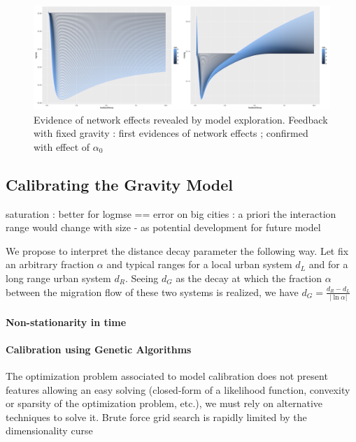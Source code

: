 \documentclass[Royal,sageh,times]{sagej}
\begin{document}
\begin{figure}
\centering
\includegraphics[width=\textwidth]{figures/Fig3}
\caption{Evidence of network effects revealed by model exploration. Feedback with fixed gravity : first evidences of network effects ; confirmed with effect of $\alpha_0$}
\end{figure}







\subsection*{Calibrating the Gravity Model}


\cite{batty1972calibration}

saturation : better for logmse == error on big cities : a priori the interaction range would change with size - as potential development for future model

We propose to interpret the distance decay parameter the following way. Let fix an arbitrary fraction $\alpha$ and typical ranges for a local urban system $d_L$ and for a long range urban system $d_R$. Seeing $d_G$ as the decay at which the fraction $\alpha$ between the migration flow of these two systems is realized, we have $d_G = \frac{d_R - d_L}{\left| \ln{\alpha} \right|}$


\paragraph{Non-stationarity in time}




\paragraph{Calibration using Genetic Algorithms}


The optimization problem associated to model calibration does not present features allowing an easy solving (closed-form of a likelihood function, convexity or sparsity of the optimization problem, etc.), we must rely on alternative techniques to solve it. Brute force grid search is rapidly limited by the dimensionality curse
\end{document}
